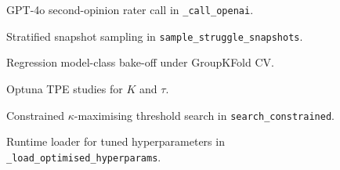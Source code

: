 \begin{figure}[H]

\caption{GPT-4o second-opinion rater call in \texttt{\_call\_openai}.}
\label{fig:appx-label}
\end{figure}

\begin{figure}[H]

\caption{Stratified snapshot sampling in \texttt{sample\_struggle\_snapshots}.}
\label{fig:appx-snapshots}
\end{figure}

\begin{figure}[H]

\caption{Regression model-class bake-off under GroupKFold CV.}
\label{fig:appx-bakeoff}
\end{figure}

\begin{figure}[H]

\caption{Optuna TPE studies for $K$ and $\tau$.}
\label{fig:appx-optuna}
\end{figure}

\begin{figure}[H]

\caption{Constrained $\kappa$-maximising threshold search in \texttt{search\_constrained}.}
\label{fig:appx-threshold}
\end{figure}

\begin{figure}[H]

\caption{Runtime loader for tuned hyperparameters in \texttt{\_load\_optimised\_hyperparams}.}
\label{fig:appx-runtimeconfig}
\end{figure}
